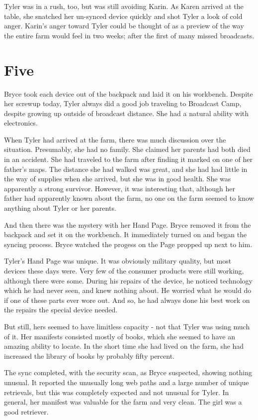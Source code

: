 \documentclass[courier]{sffms}
\begin{document}
Tyler was in a rush, too, but was still avoiding Karin.
As Karen arrived at the table, she snatched her
un-synced device quickly and shot Tyler a look of 
cold anger. Karin's anger toward Tyler could be thought
of as a preview of the way the entire farm would feel
in two weeks; after the first of many missed broadcasts.

\chapter{Five}
Bryce took each device out of the backpack and laid it on
his workbench. Despite her screwup today, Tyler always did
a good job traveling to Broadcast Camp, despite growing up
outside of broadcast distance. She had a natural ability
with electronics.

When Tyler had arrived at the farm, there was much
discussion over the situation. Presumably, she had no
family. She claimed her parents had both died in an
accident. She had traveled to the farm after finding it
marked on one of her father's maps. The distance she
had walked was great, and she had had little in the
way of supplies when she arrived, but she was in good
health. She was apparently a strong survivor. However,
it was interesting that, although her father had
apparently known about the farm, no one on the 
farm seemed to know anything about Tyler or her
parents.

And then there was the mystery with her Hand Page.
Bryce removed it from the backpack and set 
it on the workbench. It immediately turned on and
began the syncing process. Bryce watched the progess
on the Page propped up next to him.

Tyler's Hand Page was unique. It was obviously military
quality, but most devices these days were. Very few of
the consumer products were still working, although
there were some.
During his repairs of the device, he noticed technology
which he had never seen, and knew nothing about.
He worried what he would do if one of these parts
ever wore out. And so, he had always done his best
work on the repairs the special device needed.

But still, hers seemed to have
limitless capacity - not that Tyler was using much of it.
Her manifests consisted mostly of books, which she
seemed to have an amazing ability to locate. In the
short time she had lived on the farm, she had increased
the library of books by probably fifty percent.

The sync completed, with the security scan, as Bryce
suspected, showing nothing unusual. It reported the
unusually long web paths and a large number of 
unique retrievals, but this was completely expected
and not unusual for Tyler. In general, her manifest was
valuable for the farm and very clean. The girl was
a good retriever.
\end{document}
